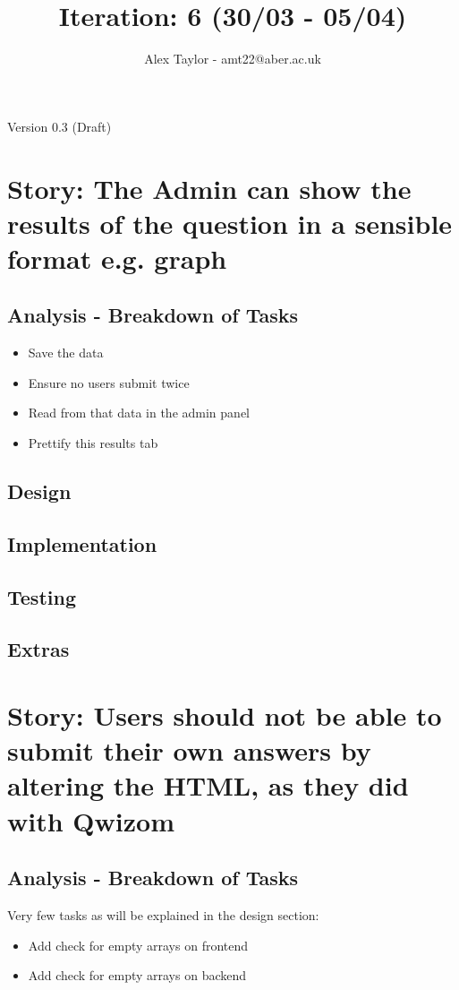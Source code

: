 \documentclass{article}
\title{Iteration: 6 (30/03 - 05/04)}
\author{Alex Taylor - amt22@aber.ac.uk}
\begin{document}
\maketitle
\begin{center}
	Version 0.3 (Draft)
\end{center}
\tableofcontents
\thispagestyle{empty}
\newpage

\section{Story: The Admin can show the results of the question in a sensible format e.g. graph}
\subsection{Analysis - Breakdown of Tasks}
\begin{itemize}
	\item Save the data
	\item Ensure no users submit twice
	\item Read from that data in the admin panel
	\item Prettify this results tab
\end{itemize}
\subsection{Design}
\subsection{Implementation}
\subsection{Testing}
\subsection{Extras}
\newpage

\section{Story: Users should not be able to submit their own answers by altering the HTML, as they did with Qwizom}
\subsection{Analysis - Breakdown of Tasks}
Very few tasks as will be explained in the design section:
\begin{itemize}
	\item Add check for empty arrays on frontend
	\item Add check for empty arrays on backend
\end{itemize}
\end{document}
